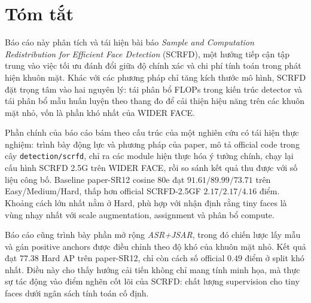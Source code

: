 ﻿\chapter*{Tóm tắt}

Báo cáo này phân tích và tái hiện bài báo \textit{Sample and Computation Redistribution for Efficient Face Detection} (SCRFD), một hướng tiếp cận tập trung vào việc tối ưu đánh đổi giữa độ chính xác và chi phí tính toán trong phát hiện khuôn mặt. Khác với các phương pháp chỉ tăng kích thước mô hình, SCRFD đặt trọng tâm vào hai nguyên lý: tái phân bổ FLOPs trong kiến trúc detector và tái phân bổ mẫu huấn luyện theo thang đo để cải thiện hiệu năng trên các khuôn mặt nhỏ, vốn là phần khó nhất của WIDER FACE.

Phần chính của báo cáo bám theo cấu trúc của một nghiên cứu có tái hiện thực nghiệm: trình bày động lực và phương pháp của paper, mô tả official code trong cây \texttt{detection/scrfd}, chỉ ra các module hiện thực hóa ý tưởng chính, chạy lại cấu hình SCRFD 2.5G trên WIDER FACE, rồi so sánh kết quả thu được với số liệu công bố. Baseline paper-SR12 cosine 80e đạt \(91.61/89.99/73.71\) trên Easy/Medium/Hard, thấp hơn official SCRFD-2.5GF \(2.17/2.17/4.16\) điểm. Khoảng cách lớn nhất nằm ở Hard, phù hợp với nhận định rằng tiny faces là vùng nhạy nhất với scale augmentation, assignment và phân bổ compute.

Báo cáo cũng trình bày phần mở rộng \textit{ASR+JSAR}, trong đó chiến lược lấy mẫu và gán positive anchors được điều chỉnh theo độ khó của khuôn mặt nhỏ. Kết quả đạt \(77.38\) Hard AP trên paper-SR12, chỉ còn cách số official \(0.49\) điểm ở split khó nhất. Điều này cho thấy hướng cải tiến không chỉ mang tính minh họa, mà thực sự tác động vào điểm nghẽn cốt lõi của SCRFD: chất lượng supervision cho tiny faces dưới ngân sách tính toán cố định.

